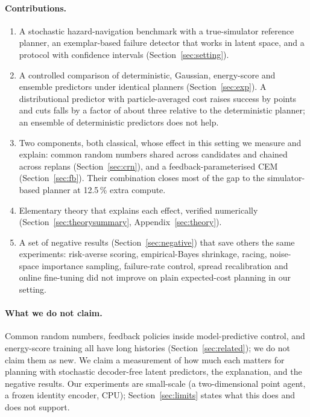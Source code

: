 \documentclass[preprint,12pt]{elsarticle}
\begin{document}
\paragraph{Contributions.}
\begin{enumerate}
\item A stochastic hazard-navigation benchmark with a true-simulator reference planner, an exemplar-based failure detector that works in latent space, and a protocol with confidence intervals (Section~\ref{sec:setting}).
\item A controlled comparison of deterministic, Gaussian, energy-score and ensemble predictors under identical planners (Section~\ref{sec:exp}). A distributional predictor with particle-averaged cost raises success by \esolSuccDiff{} points and cuts falls by a factor of about three relative to the deterministic planner; an ensemble of deterministic predictors does not help.
\item Two components, both classical, whose effect in this setting we measure and explain: common random numbers shared across candidates and chained across replans (Section~\ref{sec:crn}), and a feedback-parameterised CEM (Section~\ref{sec:fb}). Their combination closes most of the gap to the simulator-based planner at 12.5\,\% extra compute.
\item Elementary theory that explains each effect, verified numerically (Section~\ref{sec:theorysummary}, Appendix~\ref{sec:theory}).
\item A set of negative results (Section~\ref{sec:negative}) that save others the same experiments: risk-averse scoring, empirical-Bayes shrinkage, racing, noise-space importance sampling, failure-rate control, spread recalibration and online fine-tuning did not improve on plain expected-cost planning in our setting.
\end{enumerate}

\paragraph{What we do not claim.}
Common random numbers, feedback policies inside model-predictive control, and energy-score training all have long histories (Section~\ref{sec:related}); we do not claim them as new.
We claim a measurement of how much each matters for planning with stochastic decoder-free latent predictors, the explanation, and the negative results.
Our experiments are small-scale (a two-dimensional point agent, a frozen identity encoder, CPU); Section~\ref{sec:limits} states what this does and does not support.
\end{document}
